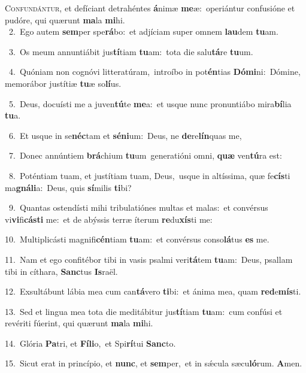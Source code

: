 \lettrine{\initial\textcolor{\initialcolor}{C}}{onfundántur,} et defíciant detrahéntes \textbf{á}\-nimæ \textbf{me}\-æ:~\star operiántur confusióne et pudóre, qui quærunt \textbf{ma}\-la \textbf{mi}\-hi.\\
{\numbfont\textcolor{\numbcolor}{~2.}}~Ego autem \textbf{sem}\-per spe\-\textbf{rá}\-bo:~\star et adjíciam super omnem \textbf{lau}\-dem \textbf{tu}\-am.\par
{\numbfont\textcolor{\numbcolor}{~3.}}~Os meum annuntiábit jus\-\textbf{tí}\-tiam \textbf{tu}\-am:~\star tota die salu\-\textbf{tá}\-re \textbf{tu}\-um.\par
{\numbfont\textcolor{\numbcolor}{~4.}}~Quóniam non cognóvi litteratúram,~\dagger introíbo in pot\-\textbf{én}\-tias \textbf{Dó}\-\textbf{mi}ni:~\star Dómine, memorábor justítiæ \textbf{tu}\-æ so\-\textbf{lí}\-us.\par
{\numbfont\textcolor{\numbcolor}{~5.}}~Deus, docuísti me a juven\-\textbf{tú}\-te \textbf{me}\-a:~\star et usque nunc pronuntiábo mira\-\textbf{bí}\-lia \textbf{tu}\-a.\par
{\numbfont\textcolor{\numbcolor}{~6.}}~Et usque in se\-\textbf{néc}\-tam et \textbf{sé}\-\textbf{ni}um:~\star Deus, ne \textbf{de}\-re\-\textbf{lín}\-quas me,\par
{\numbfont\textcolor{\numbcolor}{~7.}}~Donec annúntiem \textbf{brá}\-chium \textbf{tu}\-um~\star generatióni omni, \textbf{quæ} ven\-\textbf{tú}\-ra est:\par
{\numbfont\textcolor{\numbcolor}{~8.}}~Poténtiam tuam, et justítiam tuam, Deus,~\dagger usque in altíssima, quæ fe\-\textbf{cís}\-ti ma\-\textbf{gná}\-\textbf{li}a:~\star Deus, quis \textbf{sí}\-milis \textbf{ti}\-bi?\par
{\numbfont\textcolor{\numbcolor}{~9.}}~Quantas ostendísti mihi tribulatiónes multas et malas:~\dagger et convérsus vi\-\textbf{vi}\-fi\-\textbf{cás}\-\textbf{ti} me:~\star et de abýssis terræ íterum \textbf{re}\-du\-\textbf{xís}\-ti me:\par
{\numbfont\textcolor{\numbcolor}{10.}}~Multiplicásti magnifi\-\textbf{cén}\-tiam \textbf{tu}\-am:~\star et convérsus conso\-\textbf{lá}\-tus \textbf{es} me.\par
{\numbfont\textcolor{\numbcolor}{11.}}~Nam et ego confitébor tibi in vasis psalmi veri\-\textbf{tá}\-tem \textbf{tu}\-am:~\star Deus, psallam tibi in cíthara, \textbf{Sanc}\-tus \textbf{Is}\-raël.\par
{\numbfont\textcolor{\numbcolor}{12.}}~Exsultábunt lábia mea cum can\-\textbf{tá}\-vero \textbf{ti}\-bi:~\star et ánima mea, quam \textbf{red}\-e\-\textbf{mís}\-ti.\par
{\numbfont\textcolor{\numbcolor}{13.}}~Sed et lingua mea tota die meditábitur jus\-\textbf{tí}\-tiam \textbf{tu}\-am:~\star cum confúsi et revériti fúerint, qui quærunt \textbf{ma}\-la \textbf{mi}\-hi.\par
{\numbfont\textcolor{\numbcolor}{14.}}~Glória \textbf{Pa}\-tri, et \textbf{Fí}\-\textbf{li}o,~\star et Spi\-\textbf{rí}\-tui \textbf{Sanc}\-to.\par
{\numbfont\textcolor{\numbcolor}{15.}}~Sicut erat in princípio, et \textbf{nunc}\-, et \textbf{sem}\-per,~\star et in sǽcula sæcu\-\textbf{ló}\-rum. \textbf{A}\-men.\par
